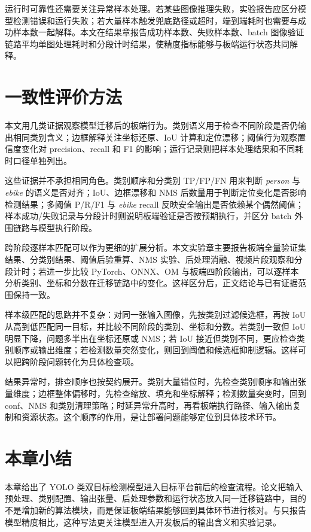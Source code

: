 运行时可靠性还需要关注异常样本处理。若某些图像推理失败，实验报告应区分模型检测错误和运行失败；若大量样本触发兜底路径或超时，端到端耗时也需要与成功样本数一起解释。本文在结果章报告成功样本数、失败样本数、batch 图像验证链路平均单图处理耗时和分段计时结果，使精度指标能够与板端运行状态共同解释。

\section{一致性评价方法}

本文用几类证据观察模型迁移后的板端行为。类别语义用于检查不同阶段是否仍输出相同类别含义；边框解释关注坐标还原、IoU 计算和定位漂移；阈值行为观察置信度变化对 precision、recall 和 F1 的影响；运行记录则把样本处理结果和不同耗时口径单独列出。

这些证据并不承担相同角色。类别顺序和分类别 TP/FP/FN 用来判断 \textit{person} 与 \textit{ebike} 的语义是否对齐；IoU、边框漂移和 NMS 后数量用于判断定位变化是否影响检测结果；多阈值 P/R/F1 与 \textit{ebike} recall 反映安全输出是否依赖某个偶然阈值；样本成功/失败记录与分段计时则说明板端验证是否按预期执行，并区分 batch 外围链路与模型执行阶段。

跨阶段逐样本匹配可以作为更细的扩展分析。本文实验章主要报告板端全量验证集结果、分类别结果、阈值后验重算、NMS 实验、后处理消融、视频片段观察和分段计时；若进一步比较 PyTorch、ONNX、OM 与板端四阶段输出，可以逐样本分析类别、坐标和分数在迁移链路中的变化。这样区分后，正文结论与已有证据范围保持一致。

样本级匹配的思路并不复杂：对同一张输入图像，先按类别过滤候选框，再按 IoU 从高到低匹配同一目标，并比较不同阶段的类别、坐标和分数。若类别一致但 IoU 明显下降，问题多半出在坐标还原或 NMS；若 IoU 接近但类别不同，更应检查类别顺序或输出维度；若检测数量突然变化，则回到阈值和候选框抑制逻辑。这样可以把跨阶段问题转化为具体检查项。

结果异常时，排查顺序也按契约展开。类别大量错位时，先检查类别顺序和输出张量维度；边框整体偏移时，先检查缩放、填充和坐标解释；检测数量突变时，回到 conf、NMS 和类别清理策略；时延异常升高时，再看板端执行路径、输入输出复制和资源状态。这个顺序的作用，是让部署问题能够定位到具体技术环节。

\section{本章小结}

本章给出了 YOLO 类双目标检测模型进入目标平台前后的检查流程。论文把输入预处理、类别配置、输出张量、后处理参数和运行状态放入同一迁移链路中，目的不是增加新的算法模块，而是保证板端结果能够回到具体环节进行核对。与只报告模型精度相比，这种写法更关注模型进入开发板后的输出含义和实验记录。
